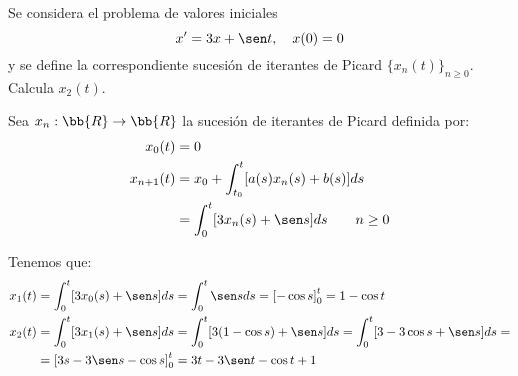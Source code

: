 \documentclass[12pt]{article}
\begin{document}
    \begin{ejercicio}
        Se considera el problema de valores iniciales
        \begin{equation*}
            x' = 3x+\sen t,\quad x(0) = 0
        \end{equation*}
        y se define la correspondiente sucesión de iterantes de Picard ${\{x_n(t)\}}_{n\geq 0}$. Calcula $x_2(t)$.

        Sea $x_n:\bb{R}\to\bb{R}$ la sucesión de iterantes de Picard definida por:
        \begin{align*}
            x_0(t)&=0 \\
            x_{n+1}(t)&=x_0+\int_{t_0}^{t}[a(s)x_n(s)+b(s)]ds \\
            &= \int_{0}^{t}[3x_n(s)+\sen s]ds \qquad n\geq 0
        \end{align*}

        Tenemos que:
        \begin{align*}
            x_1(t)&=\int_{0}^{t}[3x_0(s)+\sen s]ds
            =\int_{0}^{t}\sen sds
            =\left[-\cos s\right]_{0}^{t}=1-\cos t\\
            x_2(t)&=\int_{0}^{t}[3x_1(s)+\sen s]ds
            =\int_{0}^{t}[3(1-\cos s)+\sen s]ds
            =\int_{0}^{t}[3-3\cos s+\sen s]ds
            =\\&= \left[3s-3\sen s-\cos s\right]_{0}^{t}
            =3t-3\sen t-\cos t +1
        \end{align*}
    \end{ejercicio}
\end{document}
